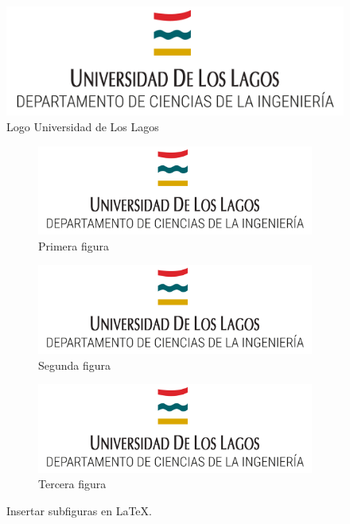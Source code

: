 \begin{figure}[htb]
    \centering
    \includegraphics[width=0.5\linewidth]{images/Logo-ULagos.png}
    \caption{Logo Universidad de Los Lagos}
    \label{foto1}
\end{figure}

\begin{figure}[htb]
\centering
\begin{subfigure}{0.31\textwidth}\centering
    \includegraphics[width=\textwidth]{images/Logo-ULagos.png}
    \caption{Primera figura}
    \label{fig1}
\end{subfigure}
\hfill
\begin{subfigure}{0.31\textwidth}\centering
    \includegraphics[width=\textwidth]{images/Logo-ULagos.png}
    \caption{Segunda figura}
    \label{fig2}
\end{subfigure}
\hfill
\begin{subfigure}{0.31\textwidth}\centering
    \includegraphics[width=\textwidth]{images/Logo-ULagos.png}
    \caption{Tercera figura}
    \label{fig3}
\end{subfigure}
        
\caption{Insertar subfiguras en \LaTeX.}
\label{figuras}
\end{figure}

